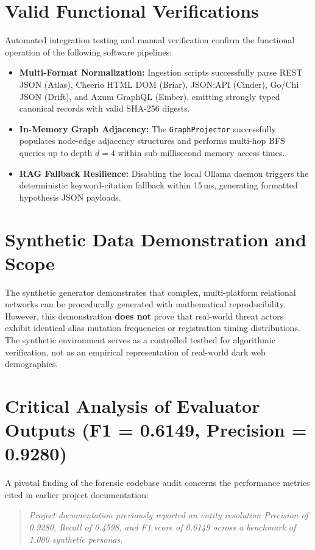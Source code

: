 \section{Valid Functional Verifications}
\label{sec:eval-functional}
Automated integration testing and manual verification confirm the functional operation of the following software pipelines:
\begin{itemize}
    \item \textbf{Multi-Format Normalization:} Ingestion scripts successfully parse REST JSON (Atlas), Cheerio HTML DOM (Briar), JSON:API (Cinder), Go/Chi JSON (Drift), and Axum GraphQL (Ember), emitting strongly typed canonical records with valid SHA-256 digests.
    \item \textbf{In-Memory Graph Adjacency:} The \texttt{GraphProjector} successfully populates node-edge adjacency structures and performs multi-hop BFS queries up to depth $d = 4$ within sub-millisecond memory access times.
    \item \textbf{RAG Fallback Resilience:} Disabling the local Ollama daemon triggers the deterministic keyword-citation fallback within 15\,ms, generating formatted hypothesis JSON payloads.
\end{itemize}

\section{Synthetic Data Demonstration and Scope}
\label{sec:eval-synthetic}
The synthetic generator demonstrates that complex, multi-platform relational networks can be procedurally generated with mathematical reproducibility. However, this demonstration \textbf{does not} prove that real-world threat actors exhibit identical alias mutation frequencies or registration timing distributions. The synthetic environment serves as a controlled testbed for algorithmic verification, not as an empirical representation of real-world dark web demographics.

\section{Critical Analysis of Evaluator Outputs (F1 = 0.6149, Precision = 0.9280)}
\label{sec:eval-metrics-disclosure}
A pivotal finding of the forensic codebase audit concerns the performance metrics cited in earlier project documentation:

\begin{quote}
\textit{Project documentation previously reported an entity resolution Precision of 0.9280, Recall of 0.4598, and F1 score of 0.6149 across a benchmark of 1,000 synthetic personas.}
\end{quote}


